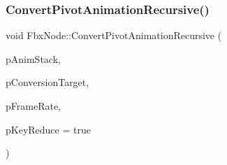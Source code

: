 \subsubsection{\texorpdfstring{Convert\+Pivot\+Animation\+Recursive()}{ConvertPivotAnimationRecursive()}}
{\footnotesize\ttfamily void Fbx\+Node\+::\+Convert\+Pivot\+Animation\+Recursive (\begin{DoxyParamCaption}\item[{\hyperlink{class_fbx_anim_stack}{Fbx\+Anim\+Stack} $\ast$}]{p\+Anim\+Stack,  }\item[{\hyperlink{class_fbx_node_ae62b7311ac4727654cdf1ebd5cbf7343}{E\+Pivot\+Set}}]{p\+Conversion\+Target,  }\item[{double}]{p\+Frame\+Rate,  }\item[{bool}]{p\+Key\+Reduce = {\ttfamily true} }\end{DoxyParamCaption})}

